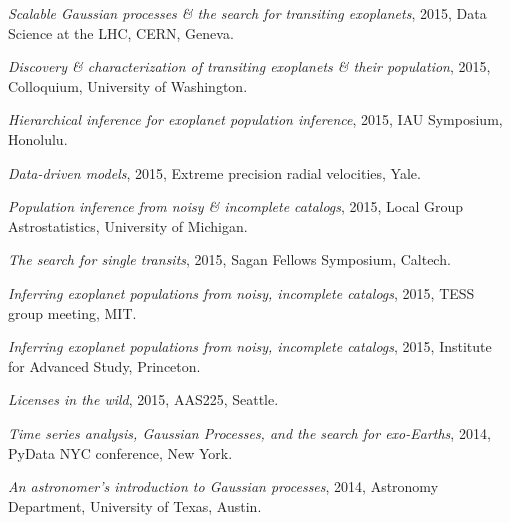 \documentclass[12pt,letterpaper]{article}
\begin{document}
\ifdefined\withpubs
    \begin{list}{}{\cvlist}
    
    \end{list}

    \begin{list}{}{\cvlist}
    
    \end{list}
    \newpage
\fi

\begin{list}{}{\cvlist}

\item \emph{Scalable Gaussian processes \& the search for transiting
    exoplanets}, 2015, Data Science at the LHC, CERN, Geneva.

\item \emph{Discovery \& characterization of transiting exoplanets \& their
    population}, 2015, Colloquium, University of Washington.

\item \emph{Hierarchical inference for exoplanet population inference},
    2015, IAU Symposium, Honolulu.

\item \emph{Data-driven models}, 2015, Extreme precision radial velocities,
    Yale.

\item \emph{Population inference from noisy \& incomplete catalogs}, 2015,
    Local Group Astrostatistics, University of Michigan.

\item \emph{The search for single transits},
    2015, Sagan Fellows Symposium, Caltech.

\item \emph{Inferring exoplanet populations from noisy, incomplete catalogs},
    2015, TESS group meeting, MIT.

\item \emph{Inferring exoplanet populations from noisy, incomplete catalogs},
    2015, Institute for Advanced Study, Princeton.

\item \emph{Licenses in the wild},
    2015, AAS225, Seattle.

\item \emph{Time series analysis, Gaussian Processes, and the search for
            exo-Earths},
    2014, PyData NYC conference, New York.

\item \emph{An astronomer's introduction to Gaussian processes},
    2014, Astronomy Department, University of Texas, Austin.


\end{list}
\end{document}
